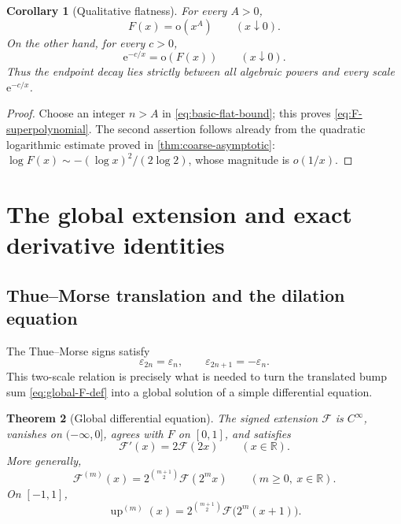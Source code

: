 \documentclass[11pt]{article}
\numberwithin{equation}{section}
\newtheorem{theorem}{Theorem}[section]
\newtheorem{corollary}[theorem]{Corollary}
\theoremstyle{definition}
\theoremstyle{remark}
\newcommand{\R}{\mathbb R}
\newcommand{\GF}{\mathcal F}
\newcommand{\upf}{\operatorname{up}}
\newcommand{\eps}{\varepsilon}
\newcommand{\e}{\mathrm e}
\newcommand{\littleoh}{\mathrm o}
\begin{document}
\begin{corollary}[Qualitative flatness]\label{cor:superpolynomial}
For every $A>0$,
\begin{equation}\label{eq:F-superpolynomial}
 F(x)=\littleoh(x^A)\qquad(x\downarrow0).
\end{equation}
On the other hand, for every $c>0$,
\begin{equation}\label{eq:F-slower-exp}
 \e^{-c/x}=\littleoh(F(x))\qquad(x\downarrow0).
\end{equation}
Thus the endpoint decay lies strictly between all algebraic powers and every scale $\e^{-c/x}$.
\end{corollary}

\begin{proof}
Choose an integer $n>A$ in \eqref{eq:basic-flat-bound}; this proves \eqref{eq:F-superpolynomial}.  The second assertion follows already from the quadratic logarithmic estimate proved in \cref{thm:coarse-asymptotic}:
$\log F(x)\sim-(\log x)^2/(2\log2)$, whose magnitude is $o(1/x)$.
\end{proof}

\section{The global extension and exact derivative identities}\label{sec:global}

\subsection{Thue--Morse translation and the dilation equation}

The Thue--Morse signs satisfy
\begin{equation}\label{eq:TM-recursion}
 \eps_{2n}=\eps_n,\qquad \eps_{2n+1}=-\eps_n.
\end{equation}
This two-scale relation is precisely what is needed to turn the translated bump sum \eqref{eq:global-F-def} into a global solution of a simple differential equation.

\begin{theorem}[Global differential equation]\label{thm:global-differential}
The signed extension $\GF$ is $C^\infty$, vanishes on $(-\infty,0]$, agrees with $F$ on $[0,1]$, and satisfies
\begin{equation}\label{eq:global-diff}
 \GF'(x)=2\GF(2x)\qquad(x\in\R).
\end{equation}
More generally,
\begin{equation}\label{eq:global-higher-derivatives}
 \GF^{(m)}(x)=2^{\binom{m+1}{2}}\GF(2^m x)
 \qquad(m\ge0,\ x\in\R).
\end{equation}
On $[-1,1]$,
\begin{equation}\label{eq:up-higher-derivatives}
 \upf^{(m)}(x)=2^{\binom{m+1}{2}}\GF\bigl(2^m(x+1)\bigr).
\end{equation}
\end{theorem}
\end{document}
